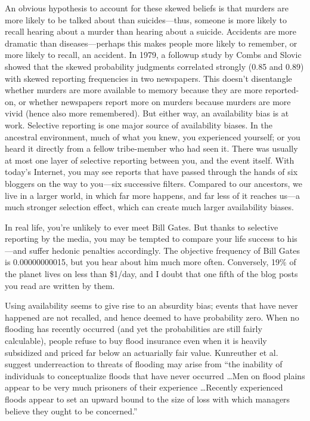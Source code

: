 {
 An obvious hypothesis to account for these skewed beliefs is that
murders are more likely to be talked about than suicides---thus,
someone is more likely to recall hearing about a murder than hearing
about a suicide. Accidents are more dramatic than diseases---perhaps
this makes people more likely to remember, or more likely to recall, an
accident. In 1979, a followup study by Combs and Slovic showed that the
skewed probability judgments correlated strongly (0.85 and 0.89) with
skewed reporting frequencies in two newspapers. This
doesn't disentangle whether murders are more available
to memory because they are more reported-on, or whether newspapers
report more on murders because murders are more vivid (hence also more
remembered). But either way, an availability bias is at work. Selective
reporting is one major source of availability biases. In the ancestral
environment, much of what you knew, you experienced yourself; or you
heard it directly from a fellow tribe-member who had seen it. There was
usually at most one layer of selective reporting between you, and the
event itself. With today's Internet, you may see
reports that have passed through the hands of six bloggers on the way
to you---six successive filters. Compared to our ancestors, we live in
a larger world, in which far more happens, and far less of it reaches
us---a much stronger selection effect, which can create much larger
availability biases.}

{
 In real life, you're unlikely to ever meet Bill
Gates. But thanks to selective reporting by the media, you may be
tempted to compare your life success to his---and suffer hedonic
penalties accordingly. The objective frequency of Bill Gates is
0.00000000015, but you hear about him much more often. Conversely, 19\%
of the planet lives on less than \$1/day, and I doubt that one fifth of
the blog posts you read are written by them.}

{
 Using availability seems to give rise to an absurdity bias; events
that have never happened are not recalled, and hence deemed to have
probability zero. When no flooding has recently occurred (and yet the
probabilities are still fairly calculable), people refuse to buy flood
insurance even when it is heavily subsidized and priced far below an
actuarially fair value. Kunreuther et al. suggest underreaction to
threats of flooding may arise from ``the inability of
individuals to conceptualize floods that have never occurred \ldots Men
on flood plains appear to be very much prisoners of their experience
\ldots Recently experienced floods appear to set an upward bound to the
size of loss with which managers believe they ought to be
concerned.''}

